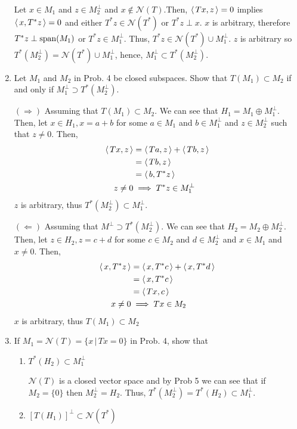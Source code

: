 \documentclass[10pt,a4paper]{report}
\begin{document}
\begin{enumerate}
	 Let $x \in M_1$ and $z \in M_2^\perp$ and $x \not \in \mathcal{N}(T)$.Then, $\left \langle\, Tx, z \,\right \rangle=0$ implies $\left \langle\, x, T^*z \,\right \rangle=0$ and either $T^*z \in \mathcal{N}(T^*)$ or $T^*z \perp x$.  $x$ is arbitrary, therefore $T^*z \perp \operatorname{span}(M_1)$ or $T^*z \in M_1^\perp$.  Thus, $T^*z \in \mathcal{N}(T^*) \cup M_1^\perp$.  $z$ is arbitrary so $T^*(M_2^\perp) = \mathcal{N}(T^*) \cup M_1^\perp$, hence, $M_1^\perp \subset T^*(M_2^\perp)$.
	
	\item Let $M_1$ and $M_2$ in Prob. 4 be closed subspaces.   Show that $T(M_1)\subset M_2$ if and only if $M_1^\perp \supset T^*(M_2^\perp)$.
	
	$(\Rightarrow)$ Assuming that $T(M_1) \subset M_2$.  We can see that $H_1 = M_1 \oplus M_1^\perp$.  Then, let $x \in H_1, x= a+b$ for some $a \in M_1$ and $b \in M_1^\perp$ and $z \in M_2^\perp$ such that $z \ne 0$.  Then, 
	\begin{align*}
		\left \langle\, Tx, z \,\right \rangle &= \left \langle\, Ta,z \,\right \rangle+\left \langle\, Tb,z \,\right \rangle \\
		&= \left \langle\, Tb,z \,\right \rangle \\
		&= \left \langle\, b, T^*z \,\right \rangle \\
		z \ne 0 &\implies T^*z \in M_1^\perp
	\end{align*}$z$ is arbitrary, thus $T^*(M_2^\perp) \subset M_1^\perp$.
	
	$(\Leftarrow)$ Assuming that $M^\perp \supset T^*(M_2^\perp)$.  We can see that $H_2 = M_2 \oplus M_2^\perp$.  Then, let $z \in H_2, z= c+d$ for some $c\in M_2$ and $d\in M_2^\perp$ and $x \in M_1$ and $x\ne 0$.  Then,
	\begin{align*}
		\left \langle\, x, T^*z \,\right \rangle &= \left \langle\, x, T^*c \,\right \rangle+\left \langle\, x, T^*d \,\right \rangle \\
		&= \left \langle\, x,T^*c \,\right \rangle \\
		&= \left \langle\, Tx, c \,\right \rangle \\
		x \ne 0 & \implies Tx \in M_2
	\end{align*}$x$ is arbitrary, thus $T(M_1) \subset M_2$
	
	\item If $M_1=\mathcal{N}(T)=\{x\,|\,Tx=0\}$ in Prob. 4, show that 
	\begin{enumerate}
		\item $T^*(H_2) \subset M_1^\perp$
		
		$\mathcal{N}(T)$ is a closed vector space and by Prob 5 we can see that if $M_2=\{0\}$ then $M_2^\perp = H_2$.  Thus, $T^*(M_2^\perp)=T^*(H_2)\subset M_1^\perp$.
		
		\item $[T(H_1)]^\perp \subset \mathcal{N}(T^*)$
		

\end{enumerate}
\end{enumerate}
\end{document}

